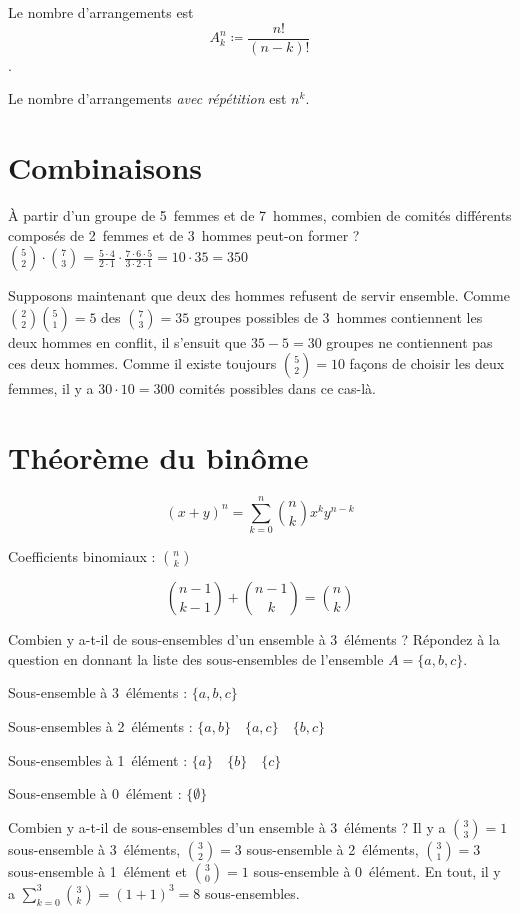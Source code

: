 
Le nombre d’arrangements est \[A_k^n \coloneqq \frac{n!}{(n-k)!}\].

Le nombre d’arrangements \emph{avec répétition} est $n^k$.



\section{Combinaisons}
\noindent À partir d’un groupe de 5~femmes et de 7~hommes, combien de comités différents composés
de 2~femmes et de 3~hommes peut-on former ?
 $\binom{5}{2} \cdot \binom{7}{3} = \frac{5 \cdot 4}{2 \cdot 1} \cdot \frac{7 \cdot 6 \cdot 5}{3 \cdot 2 \cdot 1} = 10 \cdot 35 = 350$

\noindent Supposons maintenant que deux des hommes refusent de servir ensemble. Comme $\binom{2}{2}\binom{5}{1}=5$ des $\binom{7}{3}=35$ groupes possibles de 3~hommes contiennent les deux hommes en conflit, il s’ensuit que $35-5=30$ groupes ne contiennent pas ces deux hommes. Comme il existe toujours $\binom{5}{2}=10$ façons de choisir les deux femmes, il y a $30 \cdot 10 = 300$ comités possibles dans ce cas-là.


\section{Théorème du binôme}
\[(x+y)^n = \sum_{k=0}^{n}\binom{n}{k}x^ky^{n-k}\]

Coefficients binomiaux : $\binom{n}{k}$

\[\binom{n-1}{k-1} + \binom{n-1}{k} = \binom{n}{k}\]

 Combien y a-t-il de sous-ensembles d’un ensemble à 3~éléments ? Répondez à la question en donnant la liste des sous-ensembles de l’ensemble $A = \{a,b,c\}$.
\sol

Sous-ensemble à 3~éléments : $\{a,b,c\}$

Sous-ensembles à 2~éléments : $\{a,b\} \quad \{a,c\} \quad \{b,c\}$

Sous-ensembles à 1~élément : $\{a\} \quad \{b\} \quad \{c\}$

Sous-ensemble à 0~élément : $\{\emptyset\}$

\noindent Combien y a-t-il de sous-ensembles d’un ensemble à 3~éléments ?
 Il y a $\binom{3}{3}=1$ sous-ensemble à 3~éléments, $\binom{3}{2}=3$ sous-ensemble à 2~éléments, $\binom{3}{1}=3$ sous-ensemble à 1~élément et $\binom{3}{0}=1$ sous-ensemble à 0~élément. En tout, il y a $\sum_{k=0}^{3}\binom{3}{k} = (1+1)^3 = 8$ sous-ensembles.

